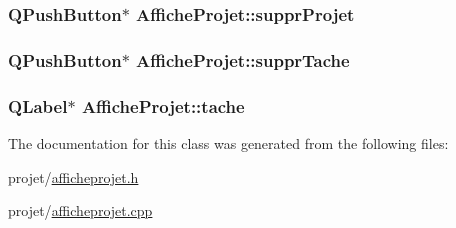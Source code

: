 \subsubsection[{suppr\+Projet}]{\setlength{\rightskip}{0pt plus 5cm}Q\+Push\+Button$\ast$ Affiche\+Projet\+::suppr\+Projet}\label{class_affiche_projet_a98651088ef2e830bd134fce0b5122873}
\hypertarget{class_affiche_projet_a8d2f2231e11b6a9eac001827dcbb0d9b}{}
\subsubsection[{suppr\+Tache}]{\setlength{\rightskip}{0pt plus 5cm}Q\+Push\+Button$\ast$ Affiche\+Projet\+::suppr\+Tache}\label{class_affiche_projet_a8d2f2231e11b6a9eac001827dcbb0d9b}
\hypertarget{class_affiche_projet_a7b1ce18fafcef5c06ab6dbdd3b280941}{}
\subsubsection[{tache}]{\setlength{\rightskip}{0pt plus 5cm}Q\+Label$\ast$ Affiche\+Projet\+::tache}\label{class_affiche_projet_a7b1ce18fafcef5c06ab6dbdd3b280941}


The documentation for this class was generated from the following files\+:\begin{DoxyCompactItemize}
\item 
projet/\hyperlink{afficheprojet_8h}{afficheprojet.\+h}\item 
projet/\hyperlink{afficheprojet_8cpp}{afficheprojet.\+cpp}\end{DoxyCompactItemize}

